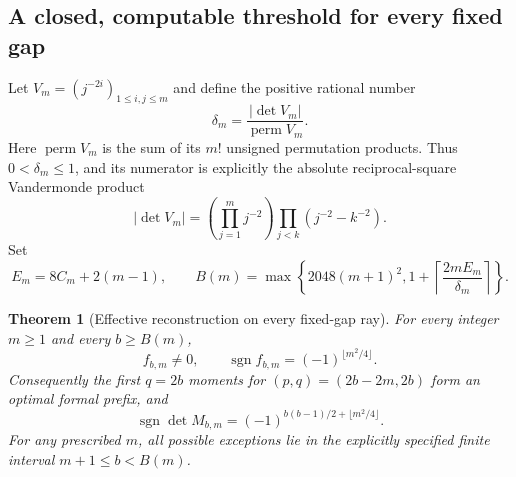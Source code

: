 \documentclass[11pt,a4paper]{article}
\numberwithin{equation}{section}
\newtheorem{theorem}{Theorem}[section]
\theoremstyle{definition}
\theoremstyle{remark}
\begin{document}
\subsection{A closed, computable threshold for every fixed gap}

Let $V_m=(j^{-2i})_{1\le i,j\le m}$ and define the positive rational
number
\begin{equation}\label{eg:delta}
 \delta_m=\frac{|\det V_m|}{\operatorname{perm}V_m}.
\end{equation}
Here $\operatorname{perm}V_m$ is the sum of its $m!$ unsigned
permutation products.  Thus $0<\delta_m\le1$, and its numerator
is explicitly the absolute reciprocal-square Vandermonde product
\[
 |\det V_m|=
 \left(\prod_{j=1}^m j^{-2}\right)
             \prod_{j<k}(j^{-2}-k^{-2}).
\]
Set
\begin{equation}\label{eg:B}
 E_m=8C_m+2(m-1),\qquad
 \boxed{\displaystyle
 B(m)=\max\left\{2048(m+1)^2,
       1+\left\lceil\frac{2mE_m}{\delta_m}\right\rceil\right\}.}
\end{equation}

\begin{theorem}[Effective reconstruction on every fixed-gap ray]
\label{eg:effective}
For every integer $m\ge1$ and every $b\ge B(m)$,
\begin{equation}\label{eg:general-sign}
 f_{b,m}\ne0,\qquad
 \operatorname{sgn}f_{b,m}=(-1)^{\lfloor m^2/4\rfloor}.
\end{equation}
Consequently the first $q=2b$ moments for
$(p,q)=(2b-2m,2b)$ form an optimal formal prefix, and
\[
 \operatorname{sgn}\det M_{b,m}
       =(-1)^{b(b-1)/2+\lfloor m^2/4\rfloor}.
\]
For any prescribed $m$, all possible exceptions lie in the explicitly
specified finite interval $m+1\le b<B(m)$.
\end{theorem}
\end{document}

